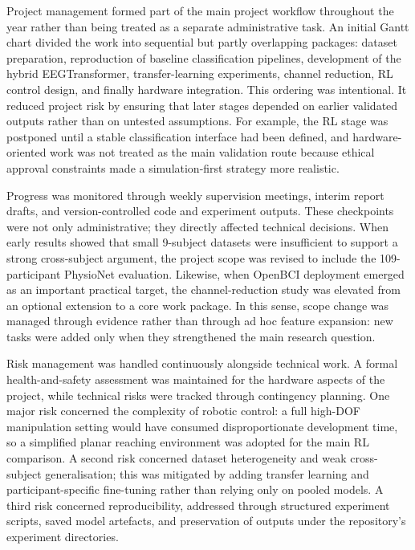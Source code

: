 \documentclass[12pt, a4paper]{article}
\begin{document}
Project management formed part of the main project workflow throughout the year rather than being treated as a separate administrative task. An initial Gantt chart divided the work into sequential but partly overlapping packages: dataset preparation, reproduction of baseline classification pipelines, development of the hybrid EEGTransformer, transfer-learning experiments, channel reduction, RL control design, and finally hardware integration. This ordering was intentional. It reduced project risk by ensuring that later stages depended on earlier validated outputs rather than on untested assumptions. For example, the RL stage was postponed until a stable classification interface had been defined, and hardware-oriented work was not treated as the main validation route because ethical approval constraints made a simulation-first strategy more realistic.

Progress was monitored through weekly supervision meetings, interim report drafts, and version-controlled code and experiment outputs. These checkpoints were not only administrative; they directly affected technical decisions. When early results showed that small 9-subject datasets were insufficient to support a strong cross-subject argument, the project scope was revised to include the 109-participant PhysioNet evaluation. Likewise, when OpenBCI deployment emerged as an important practical target, the channel-reduction study was elevated from an optional extension to a core work package. In this sense, scope change was managed through evidence rather than through ad hoc feature expansion: new tasks were added only when they strengthened the main research question.

Risk management was handled continuously alongside technical work. A formal health-and-safety assessment was maintained for the hardware aspects of the project, while technical risks were tracked through contingency planning. One major risk concerned the complexity of robotic control: a full high-DOF manipulation setting would have consumed disproportionate development time, so a simplified planar reaching environment was adopted for the main RL comparison. A second risk concerned dataset heterogeneity and weak cross-subject generalisation; this was mitigated by adding transfer learning and participant-specific fine-tuning rather than relying only on pooled models. A third risk concerned reproducibility, addressed through structured experiment scripts, saved model artefacts, and preservation of outputs under the repository's experiment directories.
\end{document}
